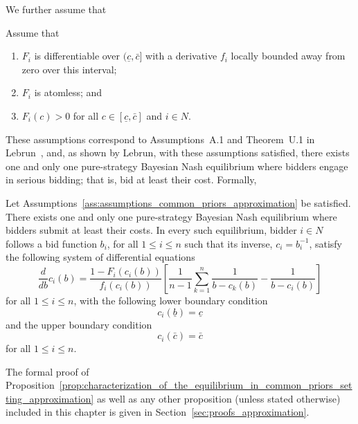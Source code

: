 We further assume that
\begin{assumptions}
\label{ass:assumptions_common_priors_approximation}
Assume that
\begin{enumerate}
  \item $F_i$ is differentiable over $(\underline{c}, \bar{c}]$ with a derivative $f_i$ locally bounded away from zero over this interval;
  \item $F_i$ is atomless; and
  \item $F_i(c)>0$ for all $c\in [\underline{c}, \bar{c}]$ and $i\in N$.
\end{enumerate}
\end{assumptions}
These assumptions correspond to Assumptions~A.1 and Theorem~U.1 in Lebrun~\cite{Lebrun2006}, and, as shown by Lebrun, with these assumptions satisfied, there exists one and only one pure-strategy Bayesian Nash equilibrium where bidders engage in serious bidding; that is, bid at least their cost. Formally,
\begin{proposition}
\label{prop:characterization_of_the_equilibrium_in_common_priors_setting_approximation}
Let Assumptions~\ref{ass:assumptions_common_priors_approximation} be satisfied. There exists one and only one pure-strategy Bayesian Nash equilibrium where bidders submit at least their costs. In every such equilibrium, bidder $i\in N$ follows a bid function $b_i$, for all $1\leq i\leq n$ such that its inverse, $c_i= b_i^{-1}$, satisfy the following system of differential equations
\begin{equation*}
  \frac{d}{db}c_i(b) = \frac{1 - F_i(c_i(b))}{f_i(c_i(b))}\left[ \frac{1}{n-1}\sum_{k=1}^n \frac{1}{b-c_k(b)} - \frac{1}{b-c_i(b)} \right]
\end{equation*}
for all $1\leq i\leq n$, with the following lower boundary condition
\begin{equation}
  \label{eq:foc_ode_lower_boundary_approximation}
  c_i(\underline{b}) = \underline{c}
\end{equation}
and the upper boundary condition
\begin{equation}
  \label{eq:foc_ode_upper_boundary_approximation}
  c_i(\bar{c}) = \bar{c}
\end{equation}
for all $1\leq i\leq n$.
\end{proposition}
\noindent The formal proof of Proposition~\ref{prop:characterization_of_the_equilibrium_in_common_priors_setting_approximation} as well as any other proposition (unless stated otherwise) included in this chapter is given in Section~\ref{sec:proofs_approximation}.

